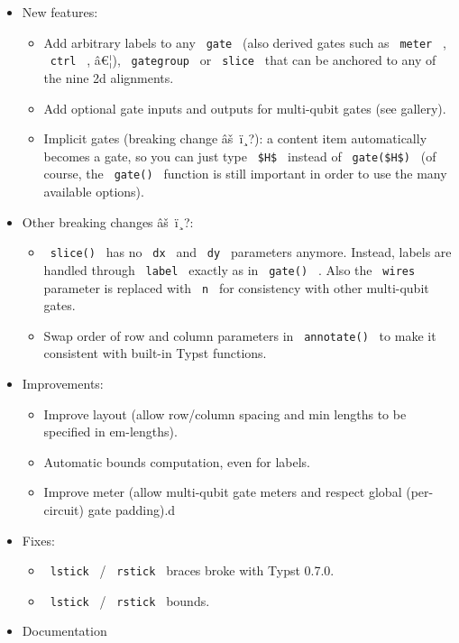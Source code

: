 \begin{itemize}
\tightlist
\item
  New features:

  \begin{itemize}
  \tightlist
  \item
    Add arbitrary labels to any \texttt{\ gate\ } (also derived gates
    such as \texttt{\ meter\ } , \texttt{\ ctrl\ } , â€¦),
    \texttt{\ gategroup\ } or \texttt{\ slice\ } that can be anchored to
    any of the nine 2d alignments.
  \item
    Add optional gate inputs and outputs for multi-qubit gates (see
    gallery).
  \item
    Implicit gates (breaking change âš~ï¸?): a content item
    automatically becomes a gate, so you can just type
    \texttt{\ \$H\$\ } instead of \texttt{\ gate(\$H\$)\ } (of course,
    the \texttt{\ gate()\ } function is still important in order to use
    the many available options).
  \end{itemize}
\item
  Other breaking changes âš~ï¸?:

  \begin{itemize}
  \tightlist
  \item
    \texttt{\ slice()\ } has no \texttt{\ dx\ } and \texttt{\ dy\ }
    parameters anymore. Instead, labels are handled through
    \texttt{\ label\ } exactly as in \texttt{\ gate()\ } . Also the
    \texttt{\ wires\ } parameter is replaced with \texttt{\ n\ } for
    consistency with other multi-qubit gates.
  \item
    Swap order of row and column parameters in \texttt{\ annotate()\ }
    to make it consistent with built-in Typst functions.
  \end{itemize}
\item
  Improvements:

  \begin{itemize}
  \tightlist
  \item
    Improve layout (allow row/column spacing and min lengths to be
    specified in em-lengths).
  \item
    Automatic bounds computation, even for labels.
  \item
    Improve meter (allow multi-qubit gate meters and respect global
    (per-circuit) gate padding).d
  \end{itemize}
\item
  Fixes:

  \begin{itemize}
  \tightlist
  \item
    \texttt{\ lstick\ } / \texttt{\ rstick\ } braces broke with Typst
    0.7.0.
  \item
    \texttt{\ lstick\ } / \texttt{\ rstick\ } bounds.
  \end{itemize}
\item
  Documentation


\end{itemize}
